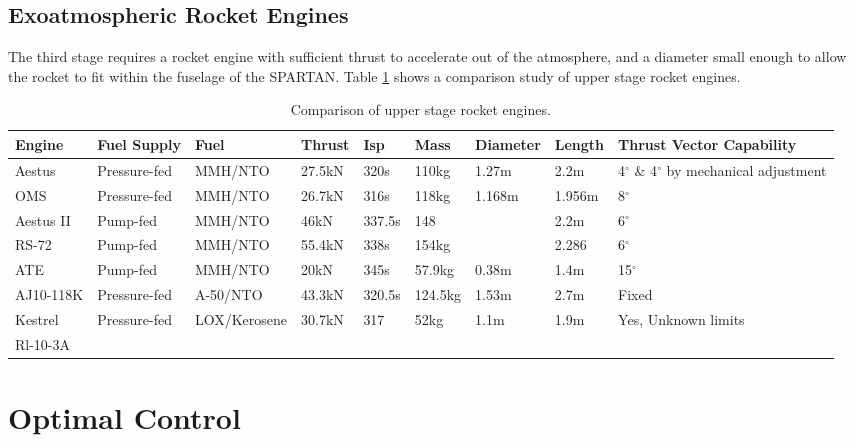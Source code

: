 \subsection{Exoatmospheric Rocket Engines}

The third stage requires a rocket engine with sufficient thrust to accelerate out of the atmosphere, and a diameter small enough to allow the rocket to fit within the fuselage of the SPARTAN. Table \ref{tab:Engine} shows a comparison study of upper stage rocket engines. 

\begin{landscape}%
	\begin{table}
		
		\begin{tabularx}{\linewidth}{|X|X|X|X|X|X|X|X|X|}
			
			\hline Engine & Fuel Supply & Fuel & Thrust & Isp & Mass & Diameter & Length & Thrust Vector Capability \\ 
			\hline Aestus & Pressure-fed & MMH/NTO & 27.5kN & 320s & 110kg & 1.27m & 2.2m & 4$^\circ$ \& 4$^\circ$ by mechanical adjustment\\ 
			\hline OMS & Pressure-fed  & MMH/NTO & 26.7kN & 316s & 118kg & 1.168m & 1.956m & 8$^\circ$\\ 
			\hline Aestus II & Pump-fed & MMH/NTO & 46kN & 337.5s & 148 &  & 2.2m  & 6$^\circ$\\ 
			\hline RS-72 & Pump-fed & MMH/NTO & 55.4kN & 338s & 154kg &  & 2.286 &  6$^\circ$\\ 
			\hline ATE & Pump-fed & MMH/NTO & 20kN & 345s & 57.9kg & 0.38m & 1.4m &  15$^\circ$\\ 
			\hline AJ10-118K & Pressure-fed & A-50/NTO & 43.3kN & 320.5s & 124.5kg & 1.53m & 2.7m & Fixed \\ 
			\hline Kestrel & Pressure-fed & LOX/Kerosene & 30.7kN & 317 & 52kg & 1.1m & 1.9m  & Yes, Unknown limits\\ 
			\hline Rl-10-3A &  &  &  &  &  &  &   &\\ 
			\hline 
		\end{tabularx} 
		\caption {Comparison of upper stage rocket engines.} 
		\label{tab:Engine}
	\end{table}
\end{landscape}



\section{Optimal Control}\label{sec:Optimisation}


